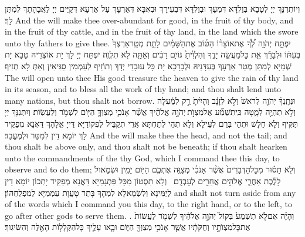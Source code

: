 {וְיוֹתְרִנָּךְ יְיָ לְטָבָא בְּוַלְדָּא דִּמְעָךְ וּבְוַלְדָּא דִּבְעִירָךְ וּבְאִבָּא דְּאַרְעָךְ עַל אַרְעָא דְּקַיֵּים יְיָ לַאֲבָהָתָךְ לְמִתַּן לָךְ׃}
{And the \lord\space will make thee over-abundant for good, in the fruit of thy body, and in the fruit of thy cattle, and in the fruit of thy land, in the land which the \lord\space swore unto thy fathers to give thee.}{}
{יִפְתַּ֣ח יְהֹוָ֣ה \pasek  לְ֠ךָ֠ אֶת\maqqaf אוֹצָר֨וֹ הַטּ֜וֹב אֶת\maqqaf הַשָּׁמַ֗יִם לָתֵ֤ת מְטַֽר\maqqaf אַרְצְךָ֙ בְּעִתּ֔וֹ וּלְבָרֵ֕ךְ אֵ֖ת כׇּל\maqqaf מַעֲשֵׂ֣ה יָדֶ֑ךָ וְהִלְוִ֙יתָ֙ גּוֹיִ֣ם רַבִּ֔ים וְאַתָּ֖ה לֹ֥א תִלְוֶֽה׃}
{יִפְתַּח יְיָ לָךְ יָת אוֹצְרֵיהּ טָבָא יָת שְׁמַיָּא לְמִתַּן מְטַר אַרְעָךְ בְּעִדָּנֵיהּ וּלְבָרָכָא יָת כָּל עוּבָדֵי יְדָךְ וְתוֹזֵיף לְעַמְמִין סַגִּיאִין וְאַתְּ לָא תְזִיף׃}
{The \lord\space will open unto thee His good treasure the heaven to give the rain of thy land in its season, and to bless all the work of thy hand; and thou shalt lend unto many nations, but thou shalt not borrow.}{}
{וּנְתָֽנְךָ֨ יְהֹוָ֤ה לְרֹאשׁ֙ וְלֹ֣א לְזָנָ֔ב וְהָיִ֙יתָ֙ רַ֣ק לְמַ֔עְלָה וְלֹ֥א תִהְיֶ֖ה לְמָ֑טָּה כִּֽי\maqqaf תִשְׁמַ֞ע אֶל\maqqaf מִצְוֺ֣ת \legarmeh  יְהֹוָ֣ה אֱלֹהֶ֗יךָ אֲשֶׁ֨ר אָנֹכִ֧י מְצַוְּךָ֛ הַיּ֖וֹם לִשְׁמֹ֥ר וְלַעֲשֽׂוֹת׃}
{וְיִתְּנִנָּךְ יְיָ תַּקִּיף וְלָא חַלָּשׁ וּתְהֵי בְּרַם לְעֵילָא וְלָא תְהֵי לְתַחְתָּא אֲרֵי תְקַבֵּיל לְפִקּוֹדַיָּא דַּייָ אֱלָהָךְ דַּאֲנָא מְפַקֵּיד לָךְ יוֹמָא דֵין לְמִטַּר וּלְמֶעֱבַד׃}
{And the \lord\space will make thee the head, and not the tail; and thou shalt be above only, and thou shalt not be beneath; if thou shalt hearken unto the commandments of the \lord\space thy God, which I command thee this day, to observe and to do them;}{}
{וְלֹ֣א תָס֗וּר מִכׇּל\maqqaf הַדְּבָרִים֙ אֲשֶׁ֨ר אָנֹכִ֜י מְצַוֶּ֥ה אֶתְכֶ֛ם הַיּ֖וֹם יָמִ֣ין וּשְׂמֹ֑אול לָלֶ֗כֶת אַחֲרֵ֛י אֱלֹהִ֥ים אֲחֵרִ֖ים לְעׇבְדָֽם׃ \petucha }
{וְלָא תִסְטוֹן מִכָּל פִּתְגָמַיָּא דַּאֲנָא מְפַקֵּיד יָתְכוֹן יוֹמָא דֵין לְיַמִּינָא וְלִשְׂמָאלָא לִמְהָךְ בָּתַר טָעֲוָת עַמְמַיָּא לְמִפְלַחְהוֹן׃}
{and shalt not turn aside from any of the words which I command you this day, to the right hand, or to the left, to go after other gods to serve them. .}{}
{וְהָיָ֗ה אִם\maqqaf לֹ֤א תִשְׁמַע֙ בְּקוֹל֙ יְהֹוָ֣ה אֱלֹהֶ֔יךָ לִשְׁמֹ֤ר לַעֲשׂוֹת֙ אֶת\maqqaf כׇּל\maqqaf מִצְוֺתָ֣יו וְחֻקֹּתָ֔יו אֲשֶׁ֛ר אָנֹכִ֥י מְצַוְּךָ֖ הַיּ֑וֹם וּבָ֧אוּ עָלֶ֛יךָ כׇּל\maqqaf הַקְּלָל֥וֹת הָאֵ֖לֶּה וְהִשִּׂיגֽוּךָ׃}
